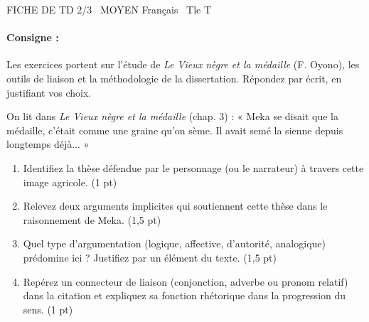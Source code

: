 \documentclass[11pt]{article}
\begin{document}
\begin{tcolorbox}[
    enhanced,
    colback=popink,
    colframe=popink,
    arc=10pt,
    boxrule=0pt,
    left=12pt, right=12pt, top=9pt, bottom=9pt
]
{\color{white}\popxbold\small FICHE DE TD 2/3 \textbullet\ MOYEN \hfill Français \textbullet\ Tle T\par}
\end{tcolorbox}
\vspace{4pt}

\paragraph{Consigne :} Les exercices portent sur l'étude de \textit{Le Vieux nègre et la médaille} (F. Oyono), les outils de liaison et la méthodologie de la dissertation. Répondez par écrit, en justifiant vos choix.

\begin{exercice}
On lit dans \textit{Le Vieux nègre et la médaille} (chap. 3) : « Meka se disait que la médaille, c'était comme une graine qu'on sème. Il avait semé la sienne depuis longtemps déjà... »
\begin{enumerate}
    \item Identifiez la thèse défendue par le personnage (ou le narrateur) à travers cette image agricole. (1 pt)
    \item Relevez deux arguments implicites qui soutiennent cette thèse dans le raisonnement de Meka. (1,5 pt)
    \item Quel type d'argumentation (logique, affective, d'autorité, analogique) prédomine ici ? Justifiez par un élément du texte. (1,5 pt)
    \item Repérez un connecteur de liaison (conjonction, adverbe ou pronom relatif) dans la citation et expliquez sa fonction rhétorique dans la progression du sens. (1 pt)
\end{enumerate}
\end{exercice}
\end{document}
